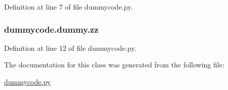 Definition at line 7 of file dummycode.\-py.

\subsubsection[{zz}]{\setlength{\rightskip}{0pt plus 5cm}dummycode.\-dummy.\-zz}\label{classdummycode_1_1dummy_af5c829ccdb5a89e8ba0f2cf476cb2aa0}


Definition at line 12 of file dummycode.\-py.



The documentation for this class was generated from the following file\-:\begin{DoxyCompactItemize}
\item 
\hyperlink{dummycode_8py}{dummycode.\-py}\end{DoxyCompactItemize}
